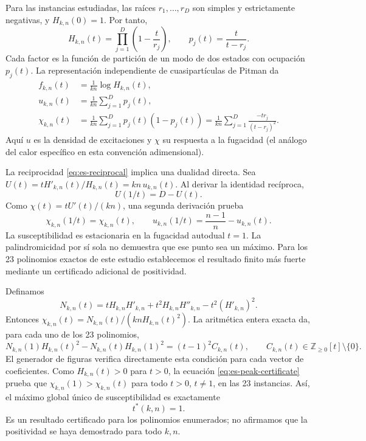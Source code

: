 \documentclass[11pt]{article}
\newcommand{\Z}{\mathbb{Z}}
\begin{document}
Para las instancias estudiadas, las raíces $r_1,\ldots,r_D$ son simples y estrictamente negativas, y $H_{k,n}(0)=1$. Por tanto,
\begin{equation}
  H_{k,n}(t)=\prod_{j=1}^{D}\left(1-\frac{t}{r_j}\right),
  \qquad p_j(t)=\frac{t}{t-r_j}.
  \label{eq:es-pitman-factorization}
\end{equation}
Cada factor es la función de partición de un modo de dos estados con ocupación $p_j(t)$. La representación independiente de cuasipartículas de Pitman da
\begin{align}
  f_{k,n}(t)&=\frac{1}{kn}\log H_{k,n}(t),\\
  u_{k,n}(t)&=\frac{1}{kn}\sum_{j=1}^{D}p_j(t),\\
  \chi_{k,n}(t)&=\frac{1}{kn}\sum_{j=1}^{D}p_j(t)(1-p_j(t))
  =\frac{1}{kn}\sum_{j=1}^{D}\frac{-t r_j}{(t-r_j)^2}.
  \label{eq:es-thermodynamics}
\end{align}
Aquí $u$ es la densidad de excitaciones y $\chi$ su respuesta a la fugacidad (el análogo del calor específico en esta convención adimensional).

La reciprocidad \eqref{eq:es-reciprocal} implica una dualidad directa. Sea $U(t)=tH'_{k,n}(t)/H_{k,n}(t)=kn\,u_{k,n}(t)$. Al derivar la identidad recíproca,
\[
  U(1/t)=D-U(t).
\]
Como $\chi(t)=tU'(t)/(kn)$, una segunda derivación prueba
\begin{equation}
  \chi_{k,n}(1/t)=\chi_{k,n}(t),
  \qquad u_{k,n}(1/t)=\frac{n-1}{n}-u_{k,n}(t).
  \label{eq:es-duality}
\end{equation}
La susceptibilidad es estacionaria en la fugacidad autodual $t=1$. La palindromicidad por sí sola no demuestra que ese punto sea un máximo. Para los 23 polinomios exactos de este estudio establecemos el resultado finito más fuerte mediante un certificado adicional de positividad.

Definamos
\[
  N_{k,n}(t)=tH_{k,n}H'_{k,n}+t^2H_{k,n}H''_{k,n}-t^2(H'_{k,n})^2.
\]
Entonces $\chi_{k,n}(t)=N_{k,n}(t)/(knH_{k,n}(t)^2)$. La aritmética entera exacta da, para cada uno de los 23 polinomios,
\begin{equation}
  N_{k,n}(1)H_{k,n}(t)^2-N_{k,n}(t)H_{k,n}(1)^2
  =(t-1)^2 C_{k,n}(t),
  \qquad C_{k,n}(t)\in\Z_{\ge0}[t]\setminus\{0\}.
  \label{eq:es-peak-certificate}
\end{equation}
El generador de figuras verifica directamente esta condición para cada vector de coeficientes. Como $H_{k,n}(t)>0$ para $t>0$, la ecuación \eqref{eq:es-peak-certificate} prueba que $\chi_{k,n}(1)>\chi_{k,n}(t)$ para todo $t>0$, $t\ne1$, en las 23 instancias. Así, el máximo global único de susceptibilidad es exactamente
\begin{equation}
  t^*(k,n)=1.
  \label{eq:es-peak}
\end{equation}
Es un resultado certificado para los polinomios enumerados; no afirmamos que la positividad se haya demostrado para todo $k,n$.
\end{document}

